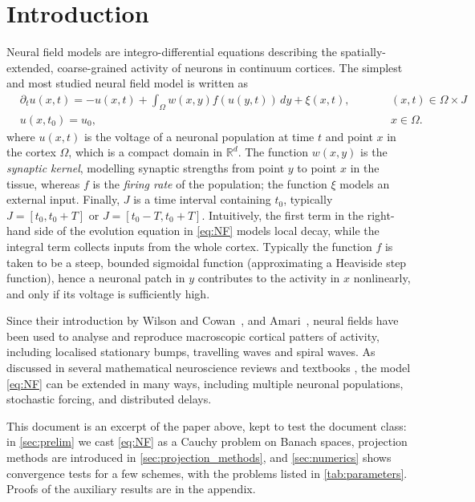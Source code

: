 \documentclass[a4paper,baskervaldx]{daarticle}
\newcommand{\rev}[1]{#1}
\newcommand{\linelabel}[1]{}
\begin{document}
\section{Introduction}\label{sec:model}
Neural field models are integro-differential equations describing the
spatially-extended, coarse-grained activity of neurons in continuum cortices. The
simplest and most studied neural field model is written as
\begin{equation} \label{eq:NF}
  \begin{aligned}
  & \partial_t u(x,t) = -u(x,t) + \int_\Omega w(x,y) f(u(y,t))\, dy + \xi(x,t), \qquad
    && (x,t) \in \Omega \times J \\
  & u(x,t_0) = u_0,                         
    && x \in \Omega.
  \end{aligned}
\end{equation}
where $u(x,t)$ is the voltage of a neuronal population at time
$t$ and point $x$ in the cortex $\Omega$, which is a compact domain in
$\mathbb{R}^d$.
%
The function $w(x,y)$ is
the \emph{synaptic kernel}, modelling synaptic strengths from point $y$ to point
$x$ in the tissue, whereas $f$ is the \emph{firing rate} of the population; the
function $\xi$ models an external input. Finally, $J$ is a time interval
\linelabel{line:negTime1} \rev{containing $t_0$, typically $J = [t_0,t_0+T]$ or $J=[t_0-T,t_0+T]$}. Intuitively, the first term in the
right-hand side of the evolution equation in \cref{eq:NF} models local decay, while
the integral term collects inputs from the whole cortex. Typically the function $f$
is taken to be a steep, bounded sigmoidal function (approximating a Heaviside step
function), hence a neuronal patch in $y$ contributes to the activity in $x$
nonlinearly, and only if its voltage is sufficiently high.

Since their introduction by Wilson and Cowan~\cite{wilson1973mathematical}, and
Amari~\cite{amari1977dynamics}, neural fields have
been used to analyse and reproduce macroscopic cortical patters of activity,
including localised stationary bumps, travelling waves and spiral waves. As discussed
in several mathematical neuroscience reviews and textbooks 
\cite{Ermentrout.1998qno,Ermentrout.2010,Bresloff.2012,
Bressloff.2014k0p,coombes2014neural}, the model
\cref{eq:NF} can be extended in many ways, including multiple neuronal
populations, stochastic forcing, and distributed delays. 


This document is an excerpt of the paper above, kept to test the document
class: in \cref{sec:prelim} we cast \cref{eq:NF} as a Cauchy problem on Banach
spaces, projection methods are introduced in \cref{sec:projection_methods}, and
\cref{sec:numerics} shows convergence tests for a few schemes, with the problems
listed in \cref{tab:parameters}. Proofs of the auxiliary results are in the
appendix.
\end{document}
